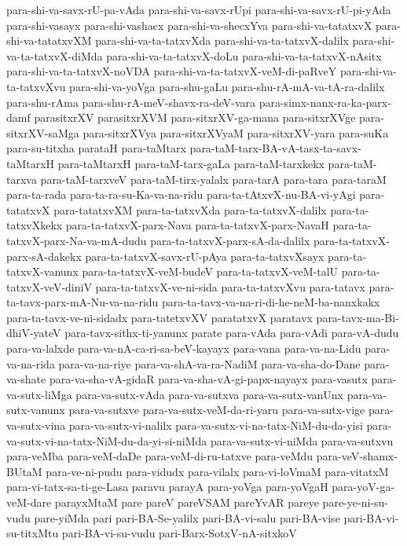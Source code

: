 {para-shi-va-savx-rU-pa-vAda
para-shi-va-savx-rUpi
para-shi-va-savx-rU-pi-yAda
para-shi-vasayx
para-shi-vashacx
para-shi-va-shecxYva
para-shi-va-tatatxvX
para-shi-va-tatatxvXM
para-shi-va-ta-tatxvXda
para-shi-va-ta-tatxvX-dalilx
para-shi-va-ta-tatxvX-diMda
para-shi-va-ta-tatxvX-doLu
para-shi-va-ta-tatxvX-nAsitx
para-shi-va-ta-tatxvX-noVDA
para-shi-va-ta-tatxvX-veM-di-paRveY
para-shi-va-ta-tatxvXvu
para-shi-va-yoVga
para-shu-gaLu
para-shu-rA-mA-va-tA-ra-dalilx
para-shu-rAma
para-shu-rA-meV-shavx-ra-deV-vara
para-simx-nanx-ra-ka-parx-damf
parasitxrXV
parasitxrXVM
para-sitxrXV-ga-mana
para-sitxrXVge
para-sitxrXV-saMga
para-sitxrXVya
para-sitxrXVyaM
para-sitxrXV-yara
para-suKa
para-su-titxha
parataH
para-taMtarx
para-taM-tarx-BA-vA-tasx-ta-savx-taMtarxH
para-taMtarxH
para-taM-tarx-gaLa
para-taM-tarxkekx
para-taM-tarxva
para-taM-tarxveV
para-taM-tirx-yalalx
para-tarA
para-tara
para-taraM
para-ta-rada
para-ta-ra-su-Ka-va-na-ridu
para-ta-tAtxvX-nu-BA-vi-yAgi
para-tatatxvX
para-tatatxvXM
para-ta-tatxvXda
para-ta-tatxvX-dalilx
para-ta-tatxvXkekx
para-ta-tatxvX-parx-Nava
para-ta-tatxvX-parx-NavaH
para-ta-tatxvX-parx-Na-va-mA-dudu
para-ta-tatxvX-parx-sA-da-dalilx
para-ta-tatxvX-parx-sA-dakekx
para-ta-tatxvX-savx-rU-pAya
para-ta-tatxvXsayx
para-ta-tatxvX-vanunx
para-ta-tatxvX-veM-budeV
para-ta-tatxvX-veM-talU
para-ta-tatxvX-veV-diniV
para-ta-tatxvX-ve-ni-sida
para-ta-tatxvXvu
para-tatavx
para-ta-tavx-parx-mA-Nu-va-na-ridu
para-ta-tavx-va-na-ri-di-he-neM-ba-nanxkakx
para-ta-tavx-ve-ni-sidadx
para-tatetxvXV
paratatxvX
paratavx
para-tavx-ma-Bi-dhiV-yateV
para-tavx-sithx-ti-yanunx
parate
para-vAda
para-vAdi
para-vA-dudu
para-va-lalxde
para-va-nA-ca-ri-sa-beV-kayayx
para-vana
para-va-na-Lidu
para-va-na-rida
para-va-na-riye
para-va-shA-va-ra-NadiM
para-va-sha-do-Dane
para-va-shate
para-va-sha-vA-gidaR
para-va-sha-vA-gi-papx-nayayx
para-vasutx
para-va-sutx-liMga
para-va-sutx-vAda
para-va-sutxva
para-va-sutx-vanUnx
para-va-sutx-vanunx
para-va-sutxve
para-va-sutx-veM-da-ri-yaru
para-va-sutx-vige
para-va-sutx-vina
para-va-sutx-vi-nalilx
para-va-sutx-vi-na-tatx-NiM-du-da-yisi
para-va-sutx-vi-na-tatx-NiM-du-da-yi-si-niMda
para-va-sutx-vi-niMda
para-va-sutxvu
para-veMba
para-veM-daDe
para-veM-di-ru-tatxve
para-veMdu
para-veV-shamx-BUtaM
para-ve-ni-pudu
para-vidudx
para-vilalx
para-vi-loVmaM
para-vitatxM
para-vi-tatx-sa-ti-ge-Lasa
paravu
parayA
para-yoVga
para-yoVgaH
para-yoV-ga-veM-dare
parayxMtaM
pare
pareV
pareVSAM
pareYvAR
pareye
pare-ye-ni-su-vudu
pare-yiMda
pari
pari-BA-Se-yalilx
pari-BA-vi-salu
pari-BA-vise
pari-BA-vi-su-titxMtu
pari-BA-vi-su-vudu
pari-Barx-SotxV-nA-sitxkoV
}
